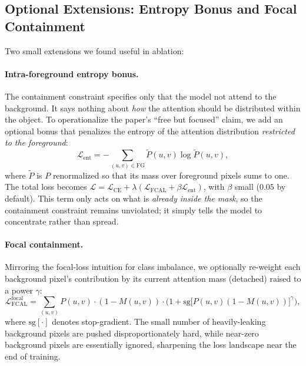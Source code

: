 \documentclass[journal]{IEEEtran}
\begin{document}
\subsection{Optional Extensions: Entropy Bonus and Focal Containment}
\label{subsec:extensions}

Two small extensions we found useful in ablation:

\paragraph{Intra-foreground entropy bonus.}
The containment constraint specifies only that the model not attend to
the background. It says nothing about \emph{how} the attention should
be distributed within the object. To operationalize the paper's
``free but focused'' claim, we add an optional bonus that penalizes
the entropy of the attention distribution \emph{restricted to the
foreground}:
\begin{equation}
  \mathcal{L}_{\mathrm{ent}}
    = - \sum_{(u,v) \in \mathrm{FG}}
        \widetilde{P}(u,v) \log \widetilde{P}(u,v),
  \label{eq:entropy}
\end{equation}
where $\widetilde{P}$ is $P$ renormalized so that its mass over foreground
pixels sums to one. The total loss becomes
$\mathcal{L} = \mathcal{L}_{\mathrm{CE}} + \lambda
(\mathcal{L}_{\mathrm{FCAL}} + \beta \mathcal{L}_{\mathrm{ent}})$,
with $\beta$ small ($0.05$ by default). This term only acts on what is
\emph{already inside the mask}, so the containment constraint remains
unviolated; it simply tells the model to concentrate rather than spread.

\paragraph{Focal containment.}
Mirroring the focal-loss intuition for class imbalance, we optionally
re-weight each background pixel's contribution by its current attention
mass (detached) raised to a power $\gamma$:
\begin{equation}
  \mathcal{L}_{\mathrm{FCAL}}^{\mathrm{focal}}
  = \sum_{(u,v)} P(u,v) \cdot (1 - M(u,v))
    \cdot \bigl(1 + \mathrm{sg}\!\bigl[P(u,v)(1-M(u,v))\bigr]^{\gamma}\bigr),
  \label{eq:focal}
\end{equation}
where $\mathrm{sg}[\cdot]$ denotes stop-gradient. The small number of
heavily-leaking background pixels are pushed disproportionately hard,
while near-zero background pixels are essentially ignored, sharpening
the loss landscape near the end of training.
\end{document}

